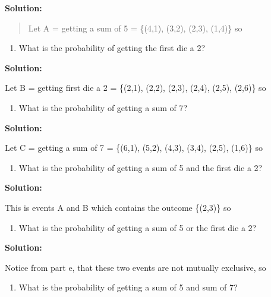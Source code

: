 \documentclass[]{book}
\providecommand{\tightlist}{%
  \setlength{\itemsep}{0pt}\setlength{\parskip}{0pt}}
\begin{document}
\textbf{Solution:}

\begin{quote}
Let A = getting a sum of 5 = \{(4,1), (3,2), (2,3), (1,4)\} so
\end{quote}

\begin{enumerate}
\def\labelenumi{\alph{enumi}.}
\setcounter{enumi}{2}
\tightlist
\item
  What is the probability of getting the first die a 2?
\end{enumerate}

\textbf{Solution:}

Let B = getting first die a 2 = \{(2,1), (2,2), (2,3), (2,4), (2,5),
(2,6)\} so

\begin{enumerate}
\def\labelenumi{\alph{enumi}.}
\setcounter{enumi}{3}
\tightlist
\item
  What is the probability of getting a sum of 7?
\end{enumerate}

\textbf{Solution:}

Let C = getting a sum of 7 = \{(6,1), (5,2), (4,3), (3,4), (2,5),
(1,6)\} so

\begin{enumerate}
\def\labelenumi{\alph{enumi}.}
\setcounter{enumi}{4}
\tightlist
\item
  What is the probability of getting a sum of 5 and the first die a 2?
\end{enumerate}

\textbf{Solution:}

This is events A and B which contains the outcome \{(2,3)\} so

\begin{enumerate}
\def\labelenumi{\alph{enumi}.}
\setcounter{enumi}{5}
\tightlist
\item
  What is the probability of getting a sum of 5 or the first die a 2?
\end{enumerate}

\textbf{Solution:}

Notice from part e, that these two events are not mutually
exclusive, so

\begin{enumerate}
\def\labelenumi{\alph{enumi}.}
\setcounter{enumi}{6}
\tightlist
\item
  What is the probability of getting a sum of 5 and sum of 7?
\end{enumerate}
\end{document}
